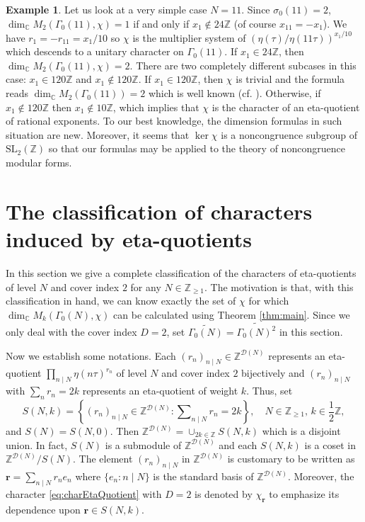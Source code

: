 \documentclass[12pt]{amsart}
\numberwithin{equation}{section}
\theoremstyle{plain}
\theoremstyle{definition}
\newtheorem{examp}[thm]{Example}
\theoremstyle{remark}
\newcommand\numZ{\mathbb{Z}}
\newcommand\numC{\mathbb{C}}
\newcommand\numgeq[2]{\mathbb{#1}_{\geq #2}}
\newcommand\slZ{\mathrm{SL}_2(\mathbb{Z})}
\newcommand\Dcover[2]{\widetilde{#1^{#2}}}
\begin{document}
\begin{examp}
Let us look at a very simple case $N=11$. Since $\sigma_0(11)=2$, $\dim_\numC M_2(\Gamma_0(11), \chi)=1$ if and only if $x_1\not\in24\numZ$ (of course $x_{11}=-x_1$). We have $r_1=-r_{11}=x_1/10$ so $\chi$ is the multiplier system of $\left(\eta(\tau)/\eta(11\tau)\right)^{x_1/10}$ which descends to a unitary character on $\Gamma_0(11)$. If $x_1\in24\numZ$, then $\dim_\numC M_2(\Gamma_0(11), \chi)=2$. There are two completely different subcases in this case: $x_1\in120\numZ$ and $x_1\not\in120\numZ$. If $x_1\in120\numZ$, then $\chi$ is trivial and the formula reads $\dim_\numC M_2(\Gamma_0(11))=2$ which is well known (cf. \cite[Corollary 7.4.3]{CS17}). Otherwise, if $x_1\not\in120\numZ$ then $x_1\not\in10\numZ$, which implies that $\chi$ is the character of an eta-quotient of rational exponents. To our best knowledge, the dimension formulas in such situation are new. Moreover, it seems that $\ker\chi$ is a noncongruence subgroup of $\slZ$ so that our formulas may be applied to the theory of noncongruence modular forms.
\end{examp}


\section{The classification of characters induced by eta-quotients}
\label{sec:The classification of characters induced by eta-quotients}
In this section we give a complete classification of the characters of eta-quotients of level $N$ and cover index $2$ for any $N\in\numgeq{Z}{1}$. The motivation is that, with this classification in hand, we can know exactly the set of $\chi$ for which $\dim_\numC M_k(\Gamma_0(N), \chi)$ can be calculated using Theorem \ref{thm:main}. Since we only deal with the cover index $D=2$, set $\widetilde{\Gamma_0(N)}=\Dcover{\Gamma_0(N)}{2}$ in this section.

Now we establish some notations. Each $(r_n)_{n\mid N}\in\numZ^{\mathscr{D}(N)}$ represents an eta-quotient $\prod_{n\mid N}\eta(n\tau)^{r_n}$ of level $N$ and cover index $2$ bijectively and $(r_n)_{n\mid N}$ with $\sum_{n}r_n=2k$ represents an eta-quotient of weight $k$. Thus, set
\begin{equation*}
S(N,k)=\left\{(r_n)_{n\mid N}\in\numZ^{\mathscr{D}(N)}\colon\sum\nolimits_{n\mid N}r_n=2k\right\},\quad N\in\numgeq{Z}{1},\, k\in\frac{1}{2}\numZ,
\end{equation*}
and $S(N)=S(N,0)$.
Then $\numZ^{\mathscr{D}(N)}=\cup_{2k\in\numZ}S(N,k)$ which is a disjoint union. In fact, $S(N)$ is a submodule of $\numZ^{\mathscr{D}(N)}$ and each $S(N,k)$ is a coset in $\numZ^{\mathscr{D}(N)}/S(N)$. The element $(r_n)_{n\mid N}$ in $\numZ^{\mathscr{D}(N)}$ is customary to be written as $\mathbf{r}=\sum_{n\mid N}r_ne_n$ where $\{e_n\colon n\mid N\}$ is the standard basis of $\numZ^{\mathscr{D}(N)}$. Moreover, the character \eqref{eq:charEtaQuotient} with $D=2$ is denoted by $\chi_{\mathbf{r}}$ to emphasize its dependence upon $\mathbf{r}\in S(N,k)$.
\end{document}
